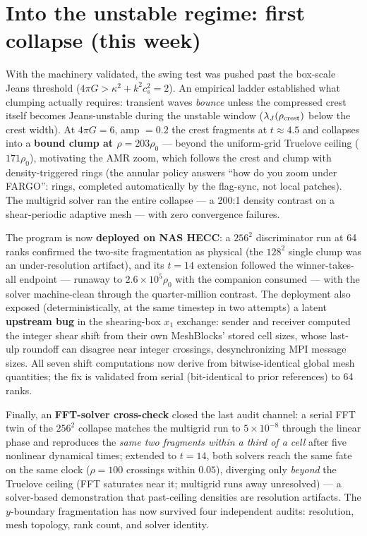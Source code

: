 \documentclass[11pt]{article}
\begin{document}
\section*{Into the unstable regime: first collapse (this week)}
With the machinery validated, the swing test was pushed past the box-scale
Jeans threshold ($4\pi G > \kappa^2 + k^2c_s^2 = 2$). An empirical ladder
established what clumping actually requires: transient waves \emph{bounce}
unless the compressed crest itself becomes Jeans-unstable during the unstable
window ($\lambda_J(\rho_{\rm crest})$ below the crest width). At
$4\pi G = 6$, amp $= 0.2$ the crest fragments at $t \approx 4.5$ and collapses
into a \textbf{bound clump at $\rho = 203\rho_0$} --- beyond the uniform-grid
Truelove ceiling ($171\rho_0$), motivating the AMR zoom, which follows the
crest and clump with density-triggered rings (the annular policy answers
``how do you zoom under FARGO'': rings, completed automatically by the
flag-sync, not local patches). The multigrid solver ran the entire collapse
--- a 200:1 density contrast on a shear-periodic adaptive mesh --- with zero
convergence failures.

The program is now \textbf{deployed on NAS HECC}: a $256^2$ discriminator run
at 64 ranks confirmed the two-site fragmentation as physical (the $128^2$
single clump was an under-resolution artifact), and its $t{=}14$ extension
followed the winner-takes-all endpoint --- runaway to $2.6\times10^5\rho_0$
with the companion consumed --- with the solver machine-clean through the
quarter-million contrast. The deployment also exposed (deterministically, at
the same timestep in two attempts) a latent \textbf{upstream bug} in the
shearing-box $x_1$ exchange: sender and receiver computed the integer shear
shift from their own MeshBlocks' stored cell sizes, whose last-ulp roundoff
can disagree near integer crossings, desynchronizing MPI message sizes. All
seven shift computations now derive from bitwise-identical global mesh
quantities; the fix is validated from serial (bit-identical to prior
references) to 64 ranks.

Finally, an \textbf{FFT-solver cross-check} closed the last audit channel:
a serial FFT twin of the $256^2$ collapse matches the multigrid run to
$5\times10^{-8}$ through the linear phase and reproduces the \emph{same two
fragments within a third of a cell} after five nonlinear dynamical times;
extended to $t{=}14$, both solvers reach the same fate on the same clock
($\rho{=}100$ crossings within $0.05$), diverging only \emph{beyond} the
Truelove ceiling (FFT saturates near it; multigrid runs away unresolved) ---
a solver-based demonstration that past-ceiling densities are resolution
artifacts. The $y$-boundary fragmentation has now survived four independent
audits: resolution, mesh topology, rank count, and solver identity.
\end{document}
